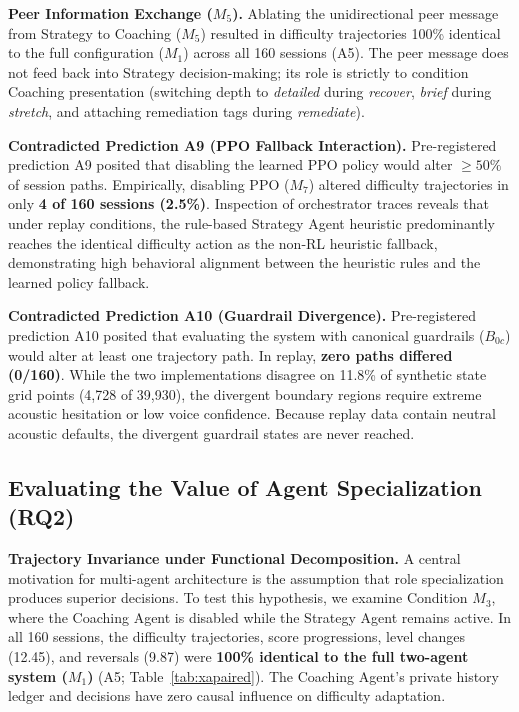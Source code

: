 \noindent\textbf{Peer Information Exchange ($M_5$).} Ablating the unidirectional peer message from Strategy to Coaching ($M_5$) resulted in difficulty trajectories 100\% identical to the full configuration ($M_1$) across all 160 sessions (A5). The peer message does not feed back into Strategy decision-making; its role is strictly to condition Coaching presentation (switching depth to \emph{detailed} during \emph{recover}, \emph{brief} during \emph{stretch}, and attaching remediation tags during \emph{remediate}).

\noindent\textbf{Contradicted Prediction A9 (PPO Fallback Interaction).} Pre-registered prediction A9 posited that disabling the learned PPO policy would alter $\ge 50\%$ of session paths. Empirically, disabling PPO ($M_7$) altered difficulty trajectories in only \textbf{4 of 160 sessions (2.5\%)}. Inspection of orchestrator traces reveals that under replay conditions, the rule-based Strategy Agent heuristic predominantly reaches the identical difficulty action as the non-RL heuristic fallback, demonstrating high behavioral alignment between the heuristic rules and the learned policy fallback.

\noindent\textbf{Contradicted Prediction A10 (Guardrail Divergence).} Pre-registered prediction A10 posited that evaluating the system with canonical guardrails ($B_{0c}$) would alter at least one trajectory path. In replay, \textbf{zero paths differed (0/160)}. While the two implementations disagree on 11.8\% of synthetic state grid points (4,728 of 39,930), the divergent boundary regions require extreme acoustic hesitation or low voice confidence. Because replay data contain neutral acoustic defaults, the divergent guardrail states are never reached.

\subsection{Evaluating the Value of Agent Specialization (RQ2)}

\begin{table}[tbp]
\centering\small
\caption{Architectural and operational comparison of the Specialized Two-Agent Architecture ($M_{\text{split}}$) versus a Unified Monolithic Controller ($M_{\text{unified}}$).}\label{tab:specialization}

\end{table}

\noindent\textbf{Trajectory Invariance under Functional Decomposition.} A central motivation for multi-agent architecture is the assumption that role specialization produces superior decisions. To test this hypothesis, we examine Condition $M_3$, where the Coaching Agent is disabled while the Strategy Agent remains active. In all 160 sessions, the difficulty trajectories, score progressions, level changes (12.45), and reversals (9.87) were \textbf{100\% identical to the full two-agent system ($M_1$)} (A5; Table~\ref{tab:xapaired}). The Coaching Agent's private history ledger and decisions have zero causal influence on difficulty adaptation.

